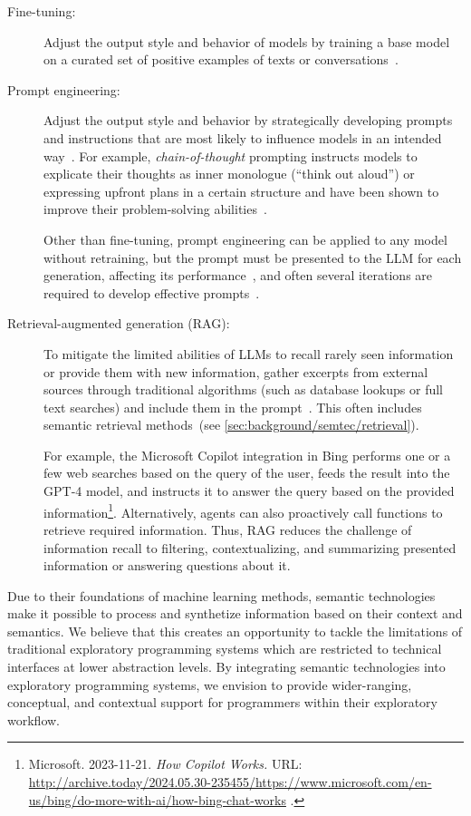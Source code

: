\begin{description}
	\item[Fine-tuning:] Adjust the output style and behavior of models by training a base model on a curated set of positive examples of texts or conversations~\cite{kojima2022large,wei2022finetuned}.

	\item[Prompt engineering:] Adjust the output style and behavior by strategically developing prompts and instructions that are most likely to influence models in an intended way~\cite{white2023prompt}.
	For example, \emph{chain-of-thought} prompting instructs models to explicate their thoughts as inner monologue (``think out aloud'') or expressing upfront plans in a certain structure and have been shown to improve their problem-solving abilities~\cite{wei2023chainofthought}.

	Other than fine-tuning, prompt engineering can be applied to any model without retraining, but the prompt must be presented to the LLM for each generation, affecting its performance~\cite{zhao2023survey}, and often several iterations are required to develop effective prompts~\cite{white2023prompt}.

	\item[Retrieval-augmented generation (RAG):] To mitigate the limited abilities of LLMs to recall rarely seen information or provide them with new information, gather excerpts from external sources through traditional algorithms (such as database lookups or full text searches) and include them in the prompt~\cite{lewis2020retrieval}.
	This often includes semantic retrieval methods~(see \cref{sec:background/semtec/retrieval}).

	For example, the Microsoft Copilot integration in Bing performs one or a few web searches based on the query of the user, feeds the result into the GPT-4 model, and instructs it to answer the query based on the provided information\footnote{
		Microsoft. 2023-11-21. \emph{How Copilot Works.}
		URL:
		\url{http://archive.today/2024.05.30-235455/https://www.microsoft.com/en-us/bing/do-more-with-ai/how-bing-chat-works}%
		.
	}.
	Alternatively, agents can also proactively call functions to retrieve required information.
	Thus, RAG reduces the challenge of information recall to filtering, contextualizing, and summarizing presented information or answering questions about it.
\end{description}

\ParSep

Due to their foundations of machine learning methods, semantic technologies make it possible to process and synthetize information based on their context and semantics.
We believe that this creates an opportunity to tackle the limitations of traditional exploratory programming systems which are restricted to technical interfaces at lower abstraction levels.
By integrating semantic technologies into exploratory programming systems, we envision to provide wider-ranging, conceptual, and contextual support for programmers within their exploratory workflow.

